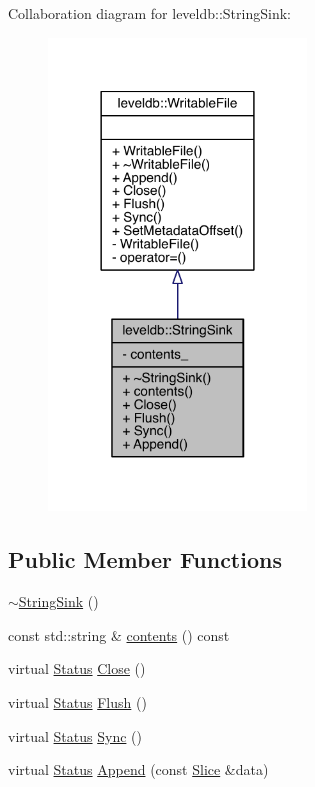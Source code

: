 Collaboration diagram for leveldb\+:\+:String\+Sink\+:\nopagebreak
\begin{figure}[H]
\begin{center}
\leavevmode
\includegraphics[width=194pt]{classleveldb_1_1_string_sink__coll__graph}
\end{center}
\end{figure}
\subsection*{Public Member Functions}
\begin{DoxyCompactItemize}
\item 
\hyperlink{classleveldb_1_1_string_sink_a0cedd3ea3f2c0353f64c8e7509bc8107}{$\sim$\+String\+Sink} ()
\item 
const std\+::string \& \hyperlink{classleveldb_1_1_string_sink_ac6a122614f3a447d2633e5a5725a9613}{contents} () const 
\item 
virtual \hyperlink{classleveldb_1_1_status}{Status} \hyperlink{classleveldb_1_1_string_sink_a40e2142f8078720ecbad8a1d48be6f48}{Close} ()
\item 
virtual \hyperlink{classleveldb_1_1_status}{Status} \hyperlink{classleveldb_1_1_string_sink_af8dc901a44e89b56726bde2782a41ab7}{Flush} ()
\item 
virtual \hyperlink{classleveldb_1_1_status}{Status} \hyperlink{classleveldb_1_1_string_sink_a77f1f2b9797737fbd89211ba0bb9a93e}{Sync} ()
\item 
virtual \hyperlink{classleveldb_1_1_status}{Status} \hyperlink{classleveldb_1_1_string_sink_a10db68412947f16bde307677a663c241}{Append} (const \hyperlink{classleveldb_1_1_slice}{Slice} \&data)
\end{DoxyCompactItemize}
